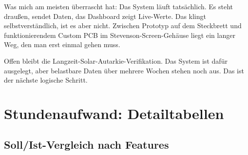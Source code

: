 \documentclass[11pt,a4paper]{scrartcl}
\begin{document}
Was mich am meisten überrascht hat: Das System läuft tatsächlich. Es steht draußen, sendet Daten, das Dashboard zeigt Live-Werte. Das klingt selbstverständlich, ist es aber nicht. Zwischen Prototyp auf dem Steckbrett und funktionierendem Custom PCB im Stevenson-Screen-Gehäuse liegt ein langer Weg, den man erst einmal gehen muss.

Offen bleibt die Langzeit-Solar-Autarkie-Verifikation. Das System ist dafür ausgelegt, aber belastbare Daten über mehrere Wochen stehen noch aus. Das ist der nächste logische Schritt.

\clearpage
\appendix

\section{Stundenaufwand: Detailtabellen}
\label{app:stunden}

\subsection*{Soll/Ist-Vergleich nach Features}
\end{document}
